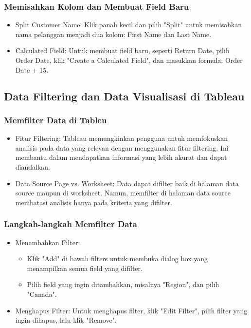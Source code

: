 \documentclass{article}
\begin{document}
\subsubsection{Memisahkan Kolom dan Membuat Field Baru}
\begin{itemize}
    \item Split Customer Name: Klik panah kecil dan pilih "Split" untuk memisahkan nama pelanggan menjadi dua kolom: First Name dan Last Name.
    \item Calculated Field: Untuk membuat field baru, seperti Return Date, pilih Order Date, klik "Create a Calculated Field", dan masukkan formula: Order Date + 15.
\end{itemize}

\subsection{Data Filtering dan Data Visualisasi di Tableau}
\subsubsection{Memfilter Data di Tableu}
\begin{itemize}
    \item Fitur Filtering: Tableau memungkinkan pengguna untuk memfokuskan analisis pada data yang relevan dengan menggunakan fitur filtering. Ini membantu dalam mendapatkan informasi yang lebih akurat dan dapat diandalkan.
    \item Data Source Page vs. Worksheet: Data dapat difilter baik di halaman data source maupun di worksheet. Namun, memfilter di halaman data source membatasi analisis hanya pada kriteria yang difilter.
\end{itemize}

\subsubsection{Langkah-langkah Memfilter Data}
\begin{itemize}
    \item Menambahkan Filter:
          \begin{itemize}
              \item Klik "Add" di bawah filters untuk membuka dialog box yang menampilkan semua field yang difilter.
              \item Pilih field yang ingin ditambahkan, misalnya "Region", dan pilih "Canada".
          \end{itemize}
    \item Menghapus Filter: Untuk menghapus filter, klik "Edit Filter", pilih filter yang ingin dihapus, lalu klik "Remove".
\end{itemize}
\end{document}
